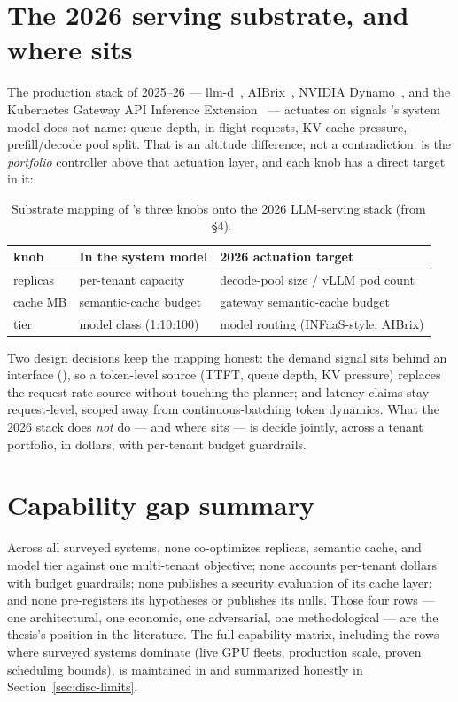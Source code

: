 \section{The 2026 serving substrate, and where \polyforge{} sits}
\label{sec:bg-substrate}

The production stack of 2025--26 --- llm-d~\citep{llmd2025},
AIBrix~\citep{aibrix2025}, NVIDIA Dynamo~\citep{dynamo2025}, and the
Kubernetes Gateway API Inference Extension~\citep{gatewayapi2025} ---
actuates on signals \polyforge{}'s system model does not name: queue depth,
in-flight requests, KV-cache pressure, prefill/decode pool split. That is an
altitude difference, not a contradiction. \polyforge{} is the
\emph{portfolio} controller above that actuation layer, and each knob has a
direct target in it:

\begin{table}[htbp]
\centering\small
\begin{tabular}{@{}lll@{}}
\toprule
\textbf{\polyforge{} knob} & \textbf{In the system model} & \textbf{2026 actuation target} \\
\midrule
replicas   & per-tenant capacity      & decode-pool size / vLLM pod count \\
cache MB   & semantic-cache budget    & gateway semantic-cache budget \\
tier       & model class (1:10:100)   & model routing (INFaaS-style; AIBrix) \\
\bottomrule
\end{tabular}
\caption{Substrate mapping of \polyforge{}'s three knobs onto the 2026
LLM-serving stack (from ~\S4).}
\label{tab:substrate-mapping}
\end{table}

Two design decisions keep the mapping honest: the demand signal sits behind
an interface (), so a token-level source (TTFT,
queue depth, KV pressure) replaces the request-rate source without touching
the planner; and latency claims stay request-level, scoped away from
continuous-batching token dynamics. What the 2026 stack does \emph{not} do
--- and where \polyforge{} sits --- is decide jointly, across a tenant
portfolio, in dollars, with per-tenant budget guardrails.

\section{Capability gap summary}

Across all surveyed systems, none co-optimizes replicas, semantic cache, and
model tier against one multi-tenant objective; none accounts per-tenant
dollars with budget guardrails; none publishes a security evaluation of its
cache layer; and none pre-registers its hypotheses or publishes its nulls.
Those four rows --- one architectural, one economic, one adversarial, one
methodological --- are the thesis's position in the literature. The full
capability matrix, including the rows where surveyed systems dominate
\polyforge{} (live GPU fleets, production scale, proven scheduling bounds),
is maintained in  and summarized honestly in
Section~\ref{sec:disc-limits}.
